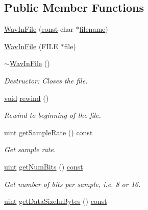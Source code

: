 \subsection*{Public Member Functions}
\begin{DoxyCompactItemize}
\item 
\hyperlink{class_wav_in_file_a4b28d803412d8ad13277e3047314c1f3}{Wav\+In\+File} (\hyperlink{getopt1_8c_a2c212835823e3c54a8ab6d95c652660e}{const} char $\ast$\hyperlink{test__portburn_8cpp_a7efa5e9c7494c7d4586359300221aa5d}{filename})
\item 
\hyperlink{class_wav_in_file_aa35bd8eacb281e8b21dbeabc336135fe}{Wav\+In\+File} (F\+I\+LE $\ast$file)
\item 
\hyperlink{class_wav_in_file_a2efa5bab6b0dc4e77627831a48b01df5}{$\sim$\+Wav\+In\+File} ()
\begin{DoxyCompactList}\small\item\em Destructor\+: Closes the file. \end{DoxyCompactList}\item 
\hyperlink{sound_8c_ae35f5844602719cf66324f4de2a658b3}{void} \hyperlink{class_wav_in_file_af7a42693bddaad98069129ce52863b29}{rewind} ()
\begin{DoxyCompactList}\small\item\em Rewind to beginning of the file. \end{DoxyCompactList}\item 
\hyperlink{_s_t_types_8h_a91ad9478d81a7aaf2593e8d9c3d06a14}{uint} \hyperlink{class_wav_in_file_a039e7e56da61f36baa985f10ad3029c8}{get\+Sample\+Rate} () \hyperlink{getopt1_8c_a2c212835823e3c54a8ab6d95c652660e}{const} 
\begin{DoxyCompactList}\small\item\em Get sample rate. \end{DoxyCompactList}\item 
\hyperlink{_s_t_types_8h_a91ad9478d81a7aaf2593e8d9c3d06a14}{uint} \hyperlink{class_wav_in_file_a701e21895038cb8a1f55bfa86bb95fc4}{get\+Num\+Bits} () \hyperlink{getopt1_8c_a2c212835823e3c54a8ab6d95c652660e}{const} 
\begin{DoxyCompactList}\small\item\em Get number of bits per sample, i.\+e. 8 or 16. \end{DoxyCompactList}\item 
\hyperlink{_s_t_types_8h_a91ad9478d81a7aaf2593e8d9c3d06a14}{uint} \hyperlink{class_wav_in_file_ac47275adfbd1b1c48d7394bfa90b4600}{get\+Data\+Size\+In\+Bytes} () \hyperlink{getopt1_8c_a2c212835823e3c54a8ab6d95c652660e}{const} 

\end{DoxyCompactItemize}
